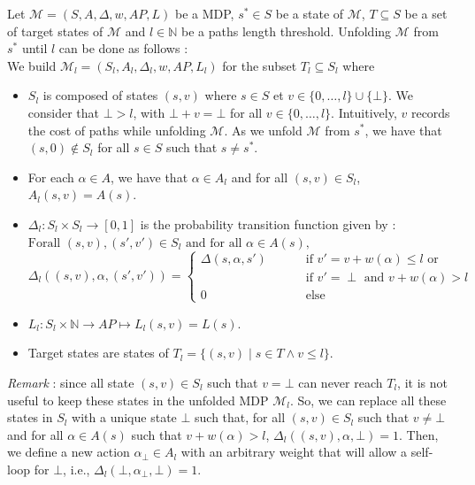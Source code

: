 \begin{definition} Let
  $\mathcal{M} = (S, A, \Delta, w, AP, L)$ be a MDP, $s^* \in S$ be a state of
  $\mathcal{M}$, $T \subseteq S$ be a set of target states of $\mathcal{M}$ and $l \in \mathbb{N}$ be a paths length threshold.
  Unfolding $\mathcal{M}$ from $s^*$ until $l$ can be done as follows : \\
  We build $\mathcal{M}_l = (S_l, A_l, \Delta_l, w, AP, L_l)$ for the subset $T_l \subseteq S_l$ where
  \begin{itemize}
  \item $S_l$ is composed of states $(s, v)$ where $s \in S$ et $v \in \{0, \dots, l\} \cup \{\bot\}$.
  We consider that $\bot > l$, with $\bot + v = \bot$ for all $v \in \{0, \dots, l\}$.
  Intuitively, $v$ records the cost of paths while unfolding $\mathcal{M}$.
  As we unfold $\mathcal{M}$ from $s^*$, we have that
  $(s, 0) \not \in S_l$ for all $s \in S$ such that $s \neq s^*$.
  \item For each $\alpha \in A$, we have that $\alpha \in A_l$ and for all $(s, v) \in S_l$, $A_l(s, v) = A(s)$.
  \item $\Delta_l : S_l \times S_l \rightarrow [0, 1]$ is the probability transition function given by :\\
  $\text{Forall } (s, v), (s', v') \in S_l \text{ and for all } \alpha \in A(s),$
  \[
  \Delta_l((s, v), \alpha, (s', v')) =
  \begin{cases}
  	\Delta(s, \alpha, s') & \quad \quad \text{ if } v' = v + w(\alpha) \leq l \text{ or}\\
  	 & \quad \quad \text{ if } v' = \perp \text{ and } v+w(\alpha) > l \\
  	0 & \quad \quad \text{ else}
  \end{cases}
  \]
  \item $L_l:S_l \times \mathbb{N} \rightarrow AP \mapsto L_l(s, v) = L(s)$.
  \item Target states are states of
  $T_l = \{(s, v) \;|\; s \in T \wedge v \leq l \}$.
  \end{itemize}
  \textit{Remark} : since all state $(s, v) \in S_l$ such that $v = \bot$ can never reach $T_l$, it is not useful to keep these states in the unfolded MDP $\mathcal{M}_l$. So, we can replace all these states in $S_l$ with a unique state $\bot$ such that, for all $(s, v) \in S_l$ such that $v \neq \bot$ and for all $\alpha \in A(s)$ such that $v + w(\alpha) > l$,
  $\Delta_l((s, v), \alpha, \bot) = 1$. Then, we define a new action $\alpha_\bot \in A_l$ with an arbitrary weight that will allow a self-loop for $\bot$, i.e., $\Delta_l(\bot, \alpha_\bot, \bot)=1$.
\end{definition}

